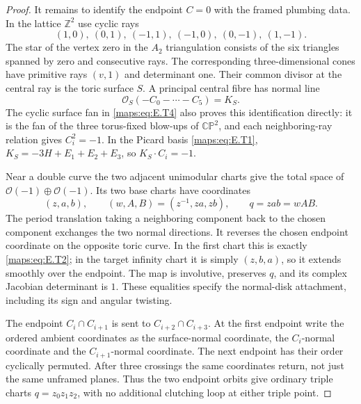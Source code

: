 \begin{proof}
It remains to identify the endpoint $C=0$ with the framed
plumbing data.  In the lattice $\mathbb Z^2$ use cyclic rays
\[
 (1,0),\ (0,1),\ (-1,1),\ (-1,0),\ (0,-1),\ (1,-1).
 \tag{E.T4}\label{maps:eq:E.T4}
\]
The star of the vertex zero in the $A_2$ triangulation consists
of the six triangles spanned by zero and consecutive rays.
The corresponding three-dimensional cones have primitive rays
$(v,1)$ and determinant one.  Their common divisor at the
central ray is the toric surface $S$.  A principal central
fibre has normal line
\[
             \mathcal O_S(-C_0-\cdots-C_5)=K_S.
 \tag{E.T5}\label{maps:eq:E.T5}
\]
The cyclic surface fan in \eqref{maps:eq:E.T4} also proves this identification
directly: it is the fan of the three torus-fixed blow-ups of
$\mathbb {CP}^2$, and each neighboring-ray relation gives
$C_i^2=-1$.  In the Picard basis \eqref{maps:eq:E.T1},
$K_S=-3H+E_1+E_2+E_3$, so $K_S\cdot C_i=-1$.

Near a double curve the two adjacent unimodular charts give
the total space of $\mathcal O(-1)\oplus\mathcal O(-1)$.
Its two base charts have coordinates
\[
 (z,a,b),\qquad
 (w,A,B)=(z^{-1},za,zb),\qquad q=zab=wAB.
 \tag{E.T6}\label{maps:eq:E.T6}
\]
The period translation taking a neighboring component back
to the chosen component exchanges the two normal directions.
It reverses the chosen endpoint coordinate on the opposite
toric curve.  In the first chart this is exactly \eqref{maps:eq:E.T2};
in the target infinity chart it is simply $(z,b,a)$, so it
extends smoothly over the endpoint.  The map is involutive,
preserves $q$, and its complex Jacobian determinant is $1$.
These equalities specify the normal-disk attachment, including
its sign and angular twisting.

The endpoint $C_i\cap C_{i+1}$ is sent to
$C_{i+2}\cap C_{i+3}$.  At the first endpoint write the
ordered ambient coordinates as the surface-normal coordinate,
the $C_i$-normal coordinate and the $C_{i+1}$-normal coordinate.
The next endpoint has their order cyclically permuted.
After three crossings the same coordinates return, not just
the same unframed planes.  Thus the two endpoint orbits give
ordinary triple charts $q=z_0z_1z_2$, with no additional
clutching loop at either triple point.


\end{proof}
